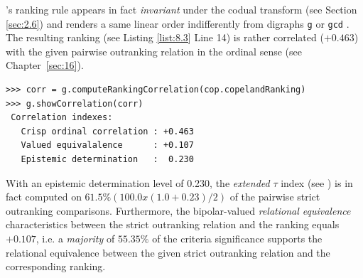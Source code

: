 \Copeland 's ranking rule appears in fact \emph{invariant} under the codual transform (see Section \ref{sec:2.6}) and renders a same linear order indifferently from digraphs \texttt{g} or \texttt{gcd} . The resulting ranking (see Listing \ref{list:8.3} Line 14) is rather correlated ($+0.463$) with the given pairwise outranking relation in the ordinal \Kendall sense (see Chapter~\ref{sec:16}).
\begin{lstlisting}[caption={Checking the quality of the \Copeland Ranking},label=list:8.4]
>>> corr = g.computeRankingCorrelation(cop.copelandRanking)
>>> g.showCorrelation(corr)
 Correlation indexes:
   Crisp ordinal correlation : +0.463
   Valued equivalalence      : +0.107
   Epistemic determination   :  0.230
\end{lstlisting}
With an epistemic determination level of 0.230, the \emph{extended} \Kendall $\tau$ index (see \citep{BIS-2012a}) is in fact computed on $61.5\% (100.0 x (1.0 + 0.23)/2)$ of the pairwise strict outranking comparisons. Furthermore, the bipolar-valued \emph{relational equivalence} characteristics between the strict outranking relation and the \Copeland ranking equals $+0.107$, i.e. a \emph{majority} of $55.35\%$ of the criteria significance supports the relational equivalence between the given strict outranking relation and the corresponding \Copeland ranking.

